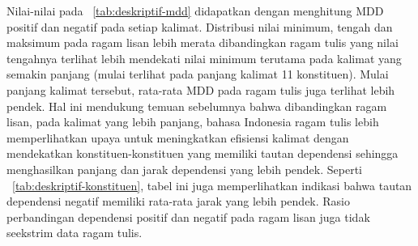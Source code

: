 Nilai-nilai pada \tab~\ref{tab:deskriptif-mdd} didapatkan dengan menghitung MDD positif dan negatif pada setiap kalimat. Distribusi nilai minimum, tengah dan maksimum pada ragam lisan lebih merata dibandingkan ragam tulis yang nilai tengahnya terlihat lebih mendekati nilai minimum terutama pada kalimat yang semakin panjang (mulai terlihat pada panjang kalimat 11 konstituen). Mulai panjang kalimat tersebut, rata-rata MDD pada ragam tulis juga terlihat lebih pendek. Hal ini mendukung temuan sebelumnya bahwa dibandingkan ragam lisan, pada kalimat yang lebih panjang, bahasa Indonesia ragam tulis lebih memperlihatkan upaya untuk meningkatkan efisiensi kalimat dengan mendekatkan konstituen-konstituen yang memiliki tautan dependensi sehingga menghasilkan panjang dan jarak dependensi yang lebih pendek. Seperti \tab~\ref{tab:deskriptif-konstituen}, tabel ini juga memperlihatkan indikasi bahwa tautan dependensi negatif memiliki rata-rata jarak yang lebih pendek. Rasio perbandingan dependensi positif dan negatif pada ragam lisan juga tidak seekstrim data ragam tulis. 

